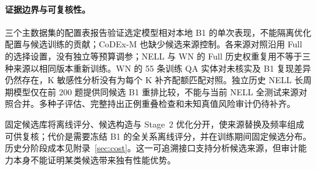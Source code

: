 \paragraph{证据边界与可复核性。}
三个主数据集的配置表报告验证选定模型相对本地 B1 的单次表现，不能隔离优化配置与候选训练的贡献；CoDEx-M 也缺少候选来源控制。各来源对照沿用 Full 的选择设置，没有独立等预算调参；NELL 与 WN 的 Full 历史权重复用不等于三种来源以相同版本重新训练。WN 的 55 条训练 QA 实体对未核实及 B1 复现差异仍然存在，K 敏感性分析没有为每个 K 补齐配额匹配对照。独立历史 NELL 长周期模型仅在前 200 题提供同候选 B1 重排比较，不能与当前 NELL 全测试来源对照合并。多种子评估、完整持出正例重叠检查和未知真值风险审计仍待补齐。

固定候选库将离线评分、候选构造与 Stage~2 优化分开，使来源替换及频率组成可供复核；代价是需要冻结 B1 的全关系离线评分，并在训练期间固定候选分布。历史分阶段成本见附录~\ref{sec:cost}。这一可追溯接口支持分析候选来源，但审计能力本身不能证明某类候选带来独有性能优势。
